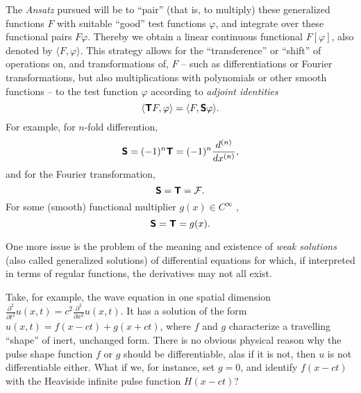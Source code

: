 The {\it Ansatz} pursued will be to ``pair'' (that is, to multiply) these generalized functions $F$ with suitable ``good''
test functions $\varphi$,
and integrate over these functional pairs $F \varphi$.
Thereby we obtain a linear continuous functional
$F[\varphi]$,
also denoted by
$\langle F, \varphi \rangle $.
This strategy allows for the
``transference'' or ``shift'' of operations on, and transformations of, $F$
-- such as differentiations or Fourier transformations, but also multiplications with polynomials or other smooth functions --
to the test function $\varphi$ according to
{\em adjoint identities}
\begin{equation}
\langle \textsf{\textbf{T}} F, \varphi \rangle
=
\langle F, \textsf{\textbf{S}} \varphi \rangle.
\end{equation}
For example,
for $n$-fold differention,
\begin{equation}
\textsf{\textbf{S}} = (-1)^n \textsf{\textbf{T}} = (-1)^n \frac{d^{(n)}}{dx^{(n)}},
\end{equation}
and for the Fourier transformation,
\begin{equation}
\textsf{\textbf{S}} =   \textsf{\textbf{T}} = {\cal F} .
\end{equation}
For some (smooth) functional multiplier $g(x)\in C^\infty$ ,
\begin{equation}
\textsf{\textbf{S}} =   \textsf{\textbf{T}} = g(x) .
\label{2013-m-ch-di-multipl}
\end{equation}


One more issue is the problem of the meaning and existence of
{\em weak solutions} (also called   generalized solutions)
of differential equations  for which, if interpreted in terms of regular functions,
the derivatives may not all exist.

{
\color{blue}
\bexample
Take, for example, the wave equation in one spatial dimension
$
\frac{\partial^2 }{\partial t^2} u(x,t)
=c^2
\frac{\partial^2 }{\partial x^2} u(x,t)
.
$
It has a  solution of the form \cite{Barut1990349} $ u(x,t)= f(x-ct) + g(x+ct)$,
where $f$ and $g$ characterize  a travelling ``shape'' of inert, unchanged form.
There is no obvious physical reason why the pulse shape function $f$ or $g$ should be differentiable,
alas if it is not, then $u$ is not differentiable either.
What if we, for instance, set $g=0$, and identify $f(x-ct)$ with the Heaviside infinite pulse function $H(x-ct)$?

\eexample
}



